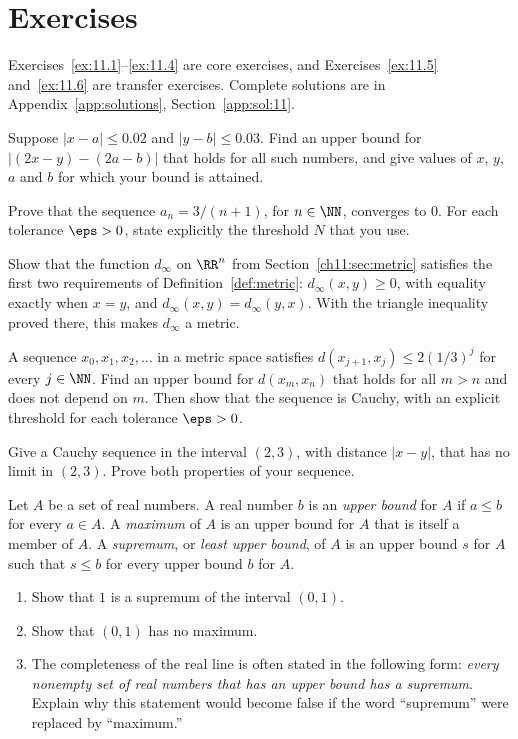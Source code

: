 \section*{Exercises}
Exercises~\ref{ex:11.1}--\ref{ex:11.4} are core exercises, and Exercises~\ref{ex:11.5} and~\ref{ex:11.6} are transfer exercises. Complete solutions are in Appendix~\ref{app:solutions}, Section~\ref{app:sol:11}.
\begin{exercise}\label{ex:11.1}Suppose $|x-a|\le0.02$ and $|y-b|\le0.03$. Find an upper bound for $|(2x-y)-(2a-b)|$ that holds for all such numbers, and give values of $x$, $y$, $a$ and $b$ for which your bound is attained.\end{exercise}
\begin{exercise}\label{ex:11.2}Prove that the sequence $a_n=3/(n+1)$, for $n\in\NN$, converges to $0$. For each tolerance $\eps>0$, state explicitly the threshold $N$ that you use.\end{exercise}
\begin{exercise}\label{ex:11.3}Show that the function $d_\infty$ on $\RR^n$ from Section~\ref{ch11:sec:metric} satisfies the first two requirements of Definition~\ref{def:metric}: $d_\infty(x,y)\ge0$, with equality exactly when $x=y$, and $d_\infty(x,y)=d_\infty(y,x)$. With the triangle inequality proved there, this makes $d_\infty$ a metric.\end{exercise}
\begin{exercise}\label{ex:11.4}A sequence $x_0,x_1,x_2,\ldots$ in a metric space satisfies $d(x_{j+1},x_j)\le2(1/3)^j$ for every $j\in\NN$. Find an upper bound for $d(x_m,x_n)$ that holds for all $m>n$ and does not depend on $m$. Then show that the sequence is Cauchy, with an explicit threshold for each tolerance $\eps>0$.\end{exercise}
\begin{exercise}\label{ex:11.5}Give a Cauchy sequence in the interval $(2,3)$, with distance $|x-y|$, that has no limit in $(2,3)$. Prove both properties of your sequence.\end{exercise}
\begin{exercise}\label{ex:11.6}Let $A$ be a set of real numbers. A real number $b$ is an \emph{upper bound} for $A$ if $a\le b$ for every $a\in A$. A \emph{maximum} of $A$ is an upper bound for $A$ that is itself a member of $A$. A \emph{supremum}, or \emph{least upper bound}, of $A$ is an upper bound $s$ for $A$ such that $s\le b$ for every upper bound $b$ for $A$.
\begin{enumerate}
\item Show that $1$ is a supremum of the interval $(0,1)$.
\item Show that $(0,1)$ has no maximum.
\item The completeness of the real line is often stated in the following form: \emph{every nonempty set of real numbers that has an upper bound has a supremum}. Explain why this statement would become false if the word ``supremum'' were replaced by ``maximum.''
\end{enumerate}
\end{exercise}
